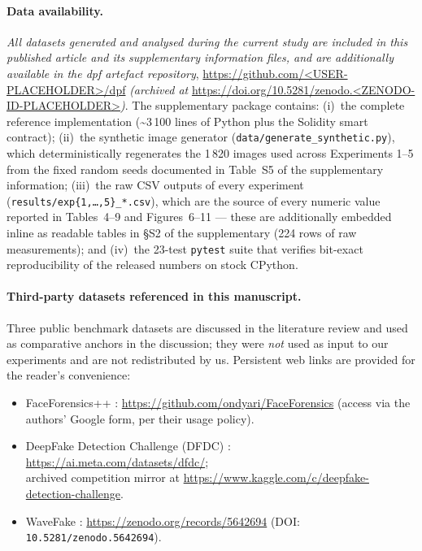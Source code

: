 \documentclass[11pt,a4paper]{article}
\theoremstyle{definition}
\theoremstyle{plain}
\theoremstyle{remark}
\begin{document}
\paragraph{Data availability.}
\emph{All datasets generated and analysed during the current study
are included in this published article and its supplementary
information files, and are additionally available in the dpf
artefact repository},
\url{https://github.com/<USER-PLACEHOLDER>/dpf}
\emph{(archived at}
\url{https://doi.org/10.5281/zenodo.<ZENODO-ID-PLACEHOLDER>}\emph{)}.
The supplementary package contains: (i)~the complete reference
implementation (\textasciitilde 3\,100 lines of Python plus the
Solidity smart contract); (ii)~the synthetic image generator
(\texttt{data/generate\_synthetic.py}), which deterministically
regenerates the 1\,820 images used across Experiments 1--5 from
the fixed random seeds documented in Table~S5 of the supplementary
information; (iii)~the raw CSV outputs of every experiment
(\texttt{results/exp\{1,\dots,5\}\_*.csv}), which are the source of
every numeric value reported in Tables~4--9 and Figures~6--11 ---
these are additionally embedded inline as readable tables in
§S2 of the supplementary (224 rows of raw measurements); and
(iv)~the 23-test \texttt{pytest} suite that verifies bit-exact
reproducibility of the released numbers on stock CPython.

\paragraph{Third-party datasets referenced in this manuscript.}
Three public benchmark datasets are discussed in the literature
review and used as comparative anchors in the discussion; they were
\emph{not} used as input to our experiments and are not
redistributed by us. Persistent web links are provided for the
reader's convenience:

\begin{itemize}[leftmargin=1.4em, itemsep=0pt, topsep=4pt]
    \item FaceForensics++ \citep{bib5}:
        \url{https://github.com/ondyari/FaceForensics}
        (access via the authors' Google form, per their usage
        policy).
    \item DeepFake Detection Challenge (DFDC) \citep{bib23}:
        \url{https://ai.meta.com/datasets/dfdc/};\\
        archived competition mirror at
        \url{https://www.kaggle.com/c/deepfake-detection-challenge}.
    \item WaveFake \citep{bib27}:
        \url{https://zenodo.org/records/5642694}
        (DOI: \texttt{10.5281/zenodo.5642694}).
\end{itemize}
\end{document}

